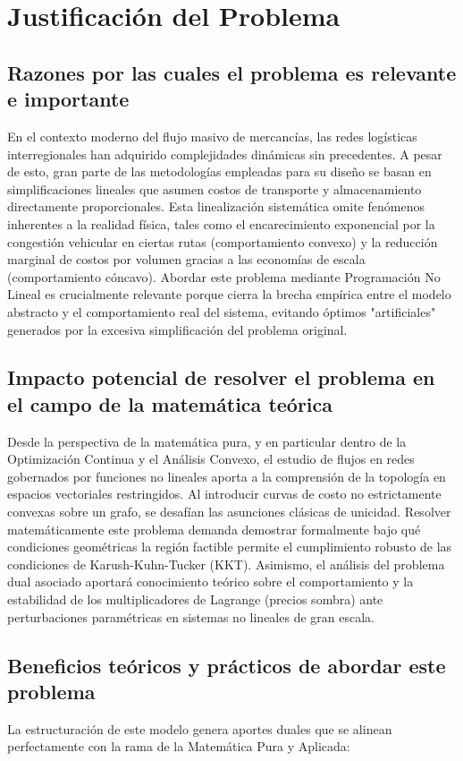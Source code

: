 \section{Justificación del Problema}

\subsection{Razones por las cuales el problema es relevante e importante}
En el contexto moderno del flujo masivo de mercancías, las redes logísticas interregionales han adquirido complejidades dinámicas sin precedentes. A pesar de esto, gran parte de las metodologías empleadas para su diseño se basan en simplificaciones lineales que asumen costos de transporte y almacenamiento directamente proporcionales. Esta linealización sistemática omite fenómenos inherentes a la realidad física, tales como el encarecimiento exponencial por la congestión vehicular en ciertas rutas (comportamiento convexo) y la reducción marginal de costos por volumen gracias a las economías de escala (comportamiento cóncavo). Abordar este problema mediante Programación No Lineal es crucialmente relevante porque cierra la brecha empírica entre el modelo abstracto y el comportamiento real del sistema, evitando óptimos "artificiales" generados por la excesiva simplificación del problema original.

\subsection{Impacto potencial de resolver el problema en el campo de la matemática teórica}
Desde la perspectiva de la matemática pura, y en particular dentro de la Optimización Continua y el Análisis Convexo, el estudio de flujos en redes gobernados por funciones no lineales aporta a la comprensión de la topología en espacios vectoriales restringidos. Al introducir curvas de costo no estrictamente convexas sobre un grafo, se desafían las asunciones clásicas de unicidad. Resolver matemáticamente este problema demanda demostrar formalmente bajo qué condiciones geométricas la región factible permite el cumplimiento robusto de las condiciones de Karush-Kuhn-Tucker (KKT). Asimismo, el análisis del problema dual asociado aportará conocimiento teórico sobre el comportamiento y la estabilidad de los multiplicadores de Lagrange (precios sombra) ante perturbaciones paramétricas en sistemas no lineales de gran escala.

\subsection{Beneficios teóricos y prácticos de abordar este problema}
La estructuración de este modelo genera aportes duales que se alinean perfectamente con la rama de la Matemática Pura y Aplicada:

